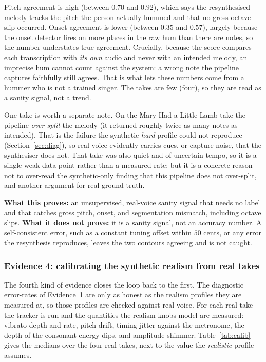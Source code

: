\documentclass[12pt,a4paper]{article}
\begin{document}
Pitch agreement is high (between $0.70$ and $0.92$), which says the resynthesised
melody tracks the pitch the person actually hummed and that no gross octave slip
occurred. Onset agreement is lower (between $0.35$ and $0.57$), largely because
the onset detector fires on more places in the raw hum than there are notes, so
the number understates true agreement. Crucially, because the score compares each
transcription with \emph{its own} audio and never with an intended melody, an
imprecise hum cannot count against the system: a wrong note the pipeline captures
faithfully still agrees. That is what lets these numbers come from a hummer who is
not a trained singer. The takes are few (four), so they are read as a sanity
signal, not a trend.

One take is worth a separate note. On the Mary-Had-a-Little-Lamb take the pipeline
\emph{over-split} the melody (it returned roughly twice as many notes as intended).
That is the failure the synthetic \emph{hard} profile could not reproduce
(Section~\ref{sec:diag}), so real voice evidently carries cues, or capture noise,
that the synthesiser does not. That take was also quiet and of uncertain tempo, so
it is a single weak data point rather than a measured rate; but it is a concrete
reason not to over-read the synthetic-only finding that this pipeline does not
over-split, and another argument for real ground truth.

\textbf{What this proves:} an unsupervised, real-voice sanity signal that needs no
label and that catches gross pitch, onset, and segmentation mismatch, including
octave slips. \textbf{What it does not prove:} it is a sanity signal, not an
accuracy number. A self-consistent error, such as a constant tuning offset within
$50$ cents, or any error the resynthesis reproduces, leaves the two contours
agreeing and is not caught.

\subsubsection{Evidence 4: calibrating the synthetic realism from real takes}
\label{sec:calib}

The fourth kind of evidence closes the loop back to the first. The diagnostic
error-rates of Evidence~1 are only as honest as the realism profiles they are
measured at, so those profiles are checked against real voice. For each real take
the tracker is run and the quantities the realism knobs model are measured:
vibrato depth and rate, pitch drift, timing jitter against the metronome, the
depth of the consonant energy dips, and amplitude shimmer.
Table~\ref{tab:calib} gives the medians over the four real takes, next to the
value the \emph{realistic} profile assumes.
\end{document}
